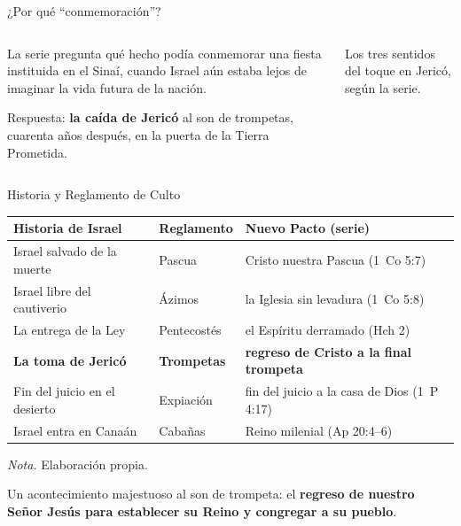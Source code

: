 \documentclass[hyperref={bookmarks=false},aspectratio=169]{beamer}
\newcommand{\destacar}[1]{\textbf{\textcolor{tierraroja}{#1}}}
\begin{document}
\begin{frame}{¿Por qué ``conmemoración''?}
\begin{columns}[c,onlytextwidth]
\begin{column}{0.52\textwidth}\small\RaggedRight
La serie pregunta qué hecho podía conmemorar una fiesta instituida en el Sinaí, cuando Israel aún estaba lejos de imaginar la vida futura de la nación.\par\medskip
Respuesta: \destacar{la caída de Jericó} al son de trompetas, cuarenta años después, en la puerta de la Tierra Prometida.
\end{column}
\begin{column}{0.46\textwidth}
\par
{\fontsize{5}{6}\selectfont\color{sepia}Los tres sentidos del toque en Jericó, según la serie.}
\end{column}
\end{columns}
\end{frame}

\begin{frame}{Historia y Reglamento de Culto}
\renewcommand{\arraystretch}{1.12}\scriptsize
\begin{tabular}{@{}L{3.1cm}L{2.2cm}L{6.3cm}@{}}
\toprule
\textbf{Historia de Israel} & \textbf{Reglamento} & \textbf{Nuevo Pacto (serie)} \\ \midrule
Israel salvado de la muerte & Pascua & Cristo nuestra Pascua (1~Co 5:7) \\
Israel libre del cautiverio & Ázimos & la Iglesia sin levadura (1~Co 5:8) \\
La entrega de la Ley & Pentecostés & el Espíritu derramado (Hch 2) \\
\textbf{La toma de Jericó} & \textbf{Trompetas} & \textbf{regreso de Cristo a la final trompeta} \\
Fin del juicio en el desierto & Expiación & fin del juicio a la casa de Dios (1~P 4:17) \\
Israel entra en Canaán & Cabañas & Reino milenial (Ap 20:4--6) \\
\bottomrule
\end{tabular}\par\medskip
{\fontsize{5}{6}\selectfont\color{sepia}\textit{Nota.} Elaboración propia.}\par\smallskip
\small\RaggedRight Un acontecimiento majestuoso al son de trompeta: el \destacar{regreso de nuestro Señor Jesús para establecer su Reino y congregar a su pueblo}.
\end{frame}
\end{document}

